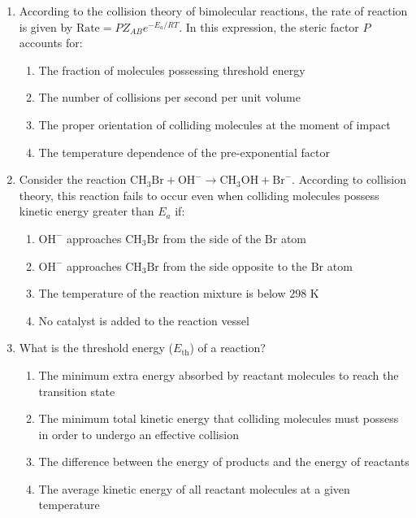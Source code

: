 \documentclass[11pt, a4paper]{article}
\begin{document}
\begin{enumerate}
\section*{Section E: Collision Theory \& Assertion-Reason}

\item According to the collision theory of bimolecular reactions, the rate of reaction is given by $\text{Rate} = P Z_{AB} e^{-E_a / RT}$. In this expression, the steric factor $P$ accounts for:
\begin{enumerate}
    \item The fraction of molecules possessing threshold energy
    \item The number of collisions per second per unit volume
    \item The proper orientation of colliding molecules at the moment of impact
    \item The temperature dependence of the pre-exponential factor
\end{enumerate}

\item Consider the reaction $\text{CH}_3\text{Br} + \text{OH}^- \rightarrow \text{CH}_3\text{OH} + \text{Br}^-$. According to collision theory, this reaction fails to occur even when colliding molecules possess kinetic energy greater than $E_a$ if:
\begin{enumerate}
    \item $\text{OH}^-$ approaches $\text{CH}_3\text{Br}$ from the side of the $\text{Br}$ atom
    \item $\text{OH}^-$ approaches $\text{CH}_3\text{Br}$ from the side opposite to the $\text{Br}$ atom
    \item The temperature of the reaction mixture is below $298\text{ K}$
    \item No catalyst is added to the reaction vessel
\end{enumerate}

\item What is the threshold energy ($E_{\text{th}}$) of a reaction?
\begin{enumerate}
    \item The minimum extra energy absorbed by reactant molecules to reach the transition state
    \item The minimum total kinetic energy that colliding molecules must possess in order to undergo an effective collision
    \item The difference between the energy of products and the energy of reactants
    \item The average kinetic energy of all reactant molecules at a given temperature
\end{enumerate}


\end{enumerate}
\end{document}
